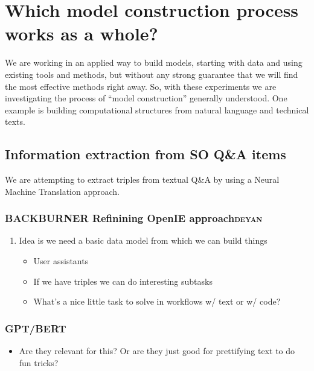 \documentclass[11pt]{article}
\begin{document}
\section{Which model construction process works as a whole?}
\label{sec:orgda51ed8}
We are working in an applied way to build models, starting with data
and using existing tools and methods, but without any strong guarantee
that we will find the most effective methods right away. So, with
these experiments we are investigating the process of “model
construction” generally understood. One example is building
computational structures from natural language and technical texts.

\subsection{Information extraction from SO Q\&A items}
\label{sec:org453a390}
We are attempting to extract triples from textual Q\&A by using a
Neural Machine Translation approach.

\subsubsection{{\bfseries\sffamily BACKBURNER} Refinining OpenIE approach\hfill{}\textsc{deyan}}
\label{sec:orgbf003cc}

\begin{enumerate}
\item Idea is we need a basic data model from which we can build things
\label{sec:org4ef7dd1}

\begin{itemize}
\item User assistants
\item If we have triples we can do interesting subtasks
\item What’s a nice little task to solve in workflows w/ text or w/ code?
\end{itemize}
\end{enumerate}

\subsubsection{GPT/BERT}
\label{sec:org70410fa}

\begin{itemize}
\item Are they relevant for this? Or are they just good for prettifying
text to do fun tricks?
\end{itemize}
\end{document}
